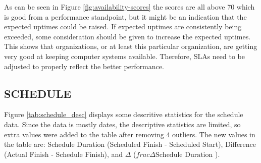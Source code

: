 \documentclass[SDSUThesis.tex]{subfiles}
\begin{document}
        As can be seen in Figure  \ref{fig:availability-scores}
        the scores are all above 70 which
        is good from a performance standpoint, but it might be an
        indication that the expected uptimes could be raised.  If expected
        uptimes are consistently being exceeded, some consideration should
        be given to increase the expected uptimes.  This shows that
        organizations, or at least this particular organization, are getting
        very good at keeping computer systems available.  Therefore,
        SLAs need to be adjusted to properly reflect the better performance.
        
        
    \subsection{SCHEDULE}
        Figure \ref{tab:schedule_desc} displays some descritive statistics
        for the schedule data.  Since the data is mostly dates, the 
        descriptive statistics are limited, so extra values were
        added to the table after removing 4 outliers.  The new values
        in the table are: Schedule Duration (Scheduled Finish - Scheduled Start),
        Difference (Actual Finish - Schedule Finish), and 
        $\Delta$ ($frac{\Delta}{\text{Schedule Duration}}$ ).
    
\end{document}
